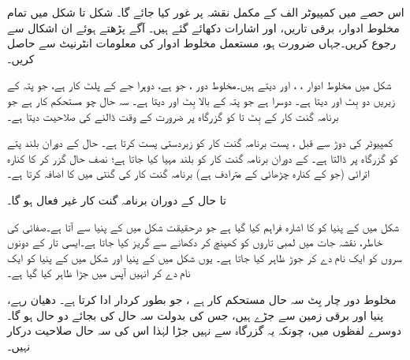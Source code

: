 اس حصے میں  کمپیوٹر  الف کے مکمل نقشہ  پر غور کیا جائے گا۔ شکل    تا شکل   میں تمام مخلوط ادوار، برقی تاریں، اور اشارات دکھائے گئے ہیں۔ آگے پڑھتے ہوئے ان  اشکال سے رجوع کریں۔جہاں ضرورت ہو، مستعمل  مخلوط ادوار  کی معلومات انٹرنیٹ سے حاصل کریں۔

شکل  میں مخلوط ادوار ، ، اور   دیتے ہیں۔مخلوط دور    ، جو  ہے، دوہرا جے کے پلٹ کار ہے، جو پتہ کے  زیریں دو بِٹ  اور  دیتا ہے۔  دوسرا   ہے جو پتہ کے بالا بِٹ  اور  دیتا ہے۔     سہ حال چو   مستحکم کار ہے جو برنامہ گنت کار  کے بِٹ  تا  کو  گزرگاہ پر ضرورت کے وقت ڈالنے کی صلاحیت دیتا ہے۔

کمپیوٹر کی دوڑ سے قبل ، پست  برنامہ گنت کار کو  زبردستی پست   کرتا ہے۔  حال کے دوران بلند  پتے کو  گزرگاہ پر ڈالتا ہے۔    کے دوران  برنامہ گنت کار کو بلند  مہیا کیا جاتا ہے؛  نصف حال گزر کر  کا  کنارہ اترائی (جو  کے کنارہ چڑھائی کے مترادف ہے) برنامہ گنت کار  کی گنتی میں  کا اضافہ کرتا ہے۔

  تا  حال کے دوران برنامہ گنت کار  غیر فعال ہو گا۔
 
 شکل  میں   کے پنیا   کو  کا اشارہ فراہم کیا گیا ہے جو  درحقیقت شکل  میں   کے پنیا  سے آتا ہے۔صفائی کی خاطر،  نقشہ جات میں لمبی تاروں کو کھینچ کر دکھانے سے گریز کیا جاتا ہے۔ایسی تار کے دونوں سروں کو ایک نام دے کر جوڑ ظاہر کیا جاتا ہے۔ یوں   شکل  میں   کے پنیا   اور   شکل  میں   کے پنیا  کو ایک نام  دے کر  انہیں آپس میں جڑا ظاہر کیا گیا ہے۔
 
 مخلوط دور      چار بِٹ   سہ حال  مستحکم کار ہے ، جو  بطور   کردار ادا کرتا ہے۔ دھیان  رہے، پنیا  اور   برقی زمین سے جڑے ہیں، جس کی بدولت  سہ حال کی بجائے دو حال ہو گا۔ دوسرے  لفظوں میں، چونکہ یہ گزرگاہ سے نہیں جڑا لہٰذا  اس کی سہ حال صلاحیت درکار نہیں۔
 
